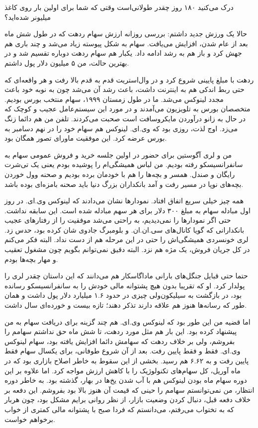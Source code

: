 درک می‌کنید ۱۸۰ روز چقدر طولانی‌است وقتی که شما برای اولین بار روی کاغذ
میلیونر شده‌اید؟

حالا یک ورزش جدید داشتم: بررسی روزانه ارزش سهام ردهت که در طول شش ماه
بعد از عام شدن، افزایش می‌یافت. سهام به شکل پیوسته زیاد می‌شد و چند باری
هم جهش کرد و باز هم به رشد ادامه داد. یکبار هم سهام ردهت دوباره تقسیم
شد و در بهترین حالت، من ۵ میلیون دلار پول داشتم.

ردهت با مبلغ پایینی شروع کرد و در وال‌استریت قدم به قدم بالا رفت و هر
واقعه‌ای که حتی ربط اندکی هم به اینترنت داشت، باعث رشد آن می‌شد چون به
نوبه خود باعث  مجدد لینوکس می‌شد. ما در طول زمستان ۱۹۹۹،
سهام منتخب بورس بودیم. متخصصان بورس به تلویزیون می‌آمدند و در مورد این
سیستم‌عامل عجیب و کوچک که در حال به زانو درآوردن مایکروسافت است صحبت
می‌کردند. تلفن من هم دائما زنگ می‌زد. اوج لذت، روزی بود که وی.ای. لینوکس
هم سهام خود را در نهم دسامبر به بورس عرضه کرد. این موفقیت ماورای تصور
همگان بود.

من و لری آگوستین برای حضور در اولین جلسه خرید و فروش عمومی سهام به
سانفرانسیسکو رفته بودیم.  من لباس همیشگی‌ام را پوشیده بودم یعنی یک
تی‌شرت رایگان و صندل. همسر و بچه‌ها را هم با خودمان برده بودیم و صحنه
وول خوردن بچه‌های نوپا در مسیر رفت و آمد بانکداران بزرگ دنیا باید صحنه
بامزه‌ای بوده باشد.

همه چیز خیلی سریع اتفاق افتاد. نمودارها نشان می‌دادند که لینوکس
وی.ای. در روز اول مبادله سهام به مبلغ ۳۰۰ دلار برای هر سهم مبادله شده
است. این سابقه نداشت. حتی اگر نمودارها را نمی‌دیدیم، به راحتی می‌شد
موفقیت را از رفتارهای عجیب بانکدارانی که گویا کانال‌های سی.ان.ان. و
بلومبرگ  جادوی شان کرده بود، حدس زد. لری
خونسردی همیشگی‌اش را حتی در این مرحله هم از دست نداد. البته فکر می‌کنم
در کل جریان فروش، یک مژه هم نزد. البته دقیق نمی‌توانم بگویم چون مشغول
تعقیب و مهار بچه‌ها بودم.

حتما حتی قبایل جنگل‌های بارانی ماداگاسکار هم می‌دانند که این داستان چقدر
لری را پولدار کرد. او که تقریبا بدون هیچ پشتوانه مالی خودش را به
سانفرانسیسکو رسانده بود، در بازگشت به سیلیکون‌ولی چیزی در حدود ۱.۶
میلیارد دلار پول داشت و همان طور که رسانه‌ها هنوز هم علاقه دارند تذکر
دهند؛ تازه بیست و خورده‌ای سال داشت.

اما قضیه من این طور بود که لینوکس وی.ای. هم چند گزینه برای دریافت سهام
به من پیشنهاد کرده بود. این بار هم مثل مورد ردهت، تا شش ماه حق نداشتم
سهامم را بفروشم، ولی بر خلاف ردهت که سهامش دائما افزایش یافته بود،
سهام لینوکس وی.ای. فقط و فقط پایین رفت. بعد از آن شروع طوفانی، برای
یکسال سهام فقط پایین رفت و به ۶.۶۲ هم رسید. بخشی از این سقوط به خاطر
اصلاح بازاری بود که در ماه آوریل، کل سهام‌های تکنولوژیک را با کاهش ارزش
مواجه کرد. اما علاوه بر این دوره سهام ماه بودن لینوکس هم با آب شدن
یخ‌ها در بهار، گذشته بود. به خاطر دوره انتظار، من نمی‌توانستم سهامم را
حینی که قیمت آن هنوز بالا بود بفروشم. این دفعه بر خلاف دفعه قبل، دنبال
کردن وضعیت بازار، از نظر روانی برایم مشکل بود، چون هربار که به تختواب
می‌رفتم، می‌دانستم که فردا صبح با پشتوانه مالی کمتری از خواب برخواهم
خواست.

